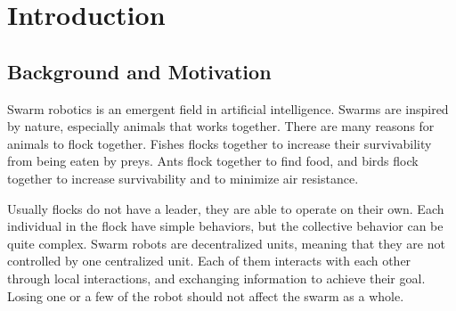 \chapter{Introduction}
\label{cha:Introduction}





\section{Background and Motivation}
\label{sec:BackgroundAndMotivation}

Swarm robotics is an emergent field in artificial intelligence. Swarms are inspired by nature, especially animals that works together. There are many reasons for animals to flock together. Fishes flocks together to increase their survivability from being eaten by preys. Ants flock together to find food, and birds flock together to increase survivability and to minimize air resistance.

Usually flocks do not have a leader, they are able to operate on their own. Each individual in the flock have simple behaviors, but the collective behavior can be quite complex. Swarm robots are decentralized units, meaning that they are not controlled by one centralized unit. Each of them interacts with each other through local interactions, and exchanging information to achieve their goal. Losing one or a few of the robot should not affect the swarm as a whole.

